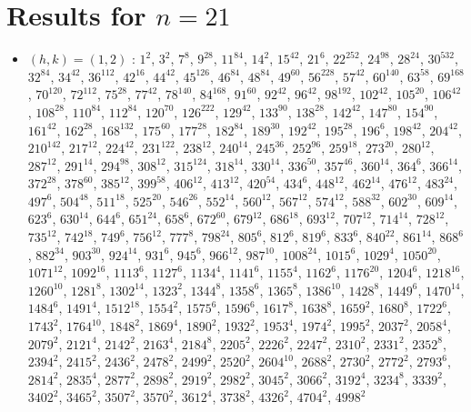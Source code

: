 \section{Results for $n=21$}
\begin{itemize}
\item $(h,k)=(1,2)$ : $1^{2}$, $3^{2}$, $7^{8}$, $9^{28}$, $11^{84}$, $14^{2}$, $15^{42}$, $21^{6}$, $22^{252}$, $24^{98}$, $28^{24}$, $30^{532}$, $32^{84}$, $34^{42}$, $36^{112}$, $42^{16}$, $44^{42}$, $45^{126}$, $46^{84}$, $48^{84}$, $49^{60}$, $56^{228}$, $57^{42}$, $60^{140}$, $63^{58}$, $69^{168}$, $70^{120}$, $72^{112}$, $75^{28}$, $77^{42}$, $78^{140}$, $84^{168}$, $91^{60}$, $92^{42}$, $96^{42}$, $98^{192}$, $102^{42}$, $105^{20}$, $106^{42}$, $108^{28}$, $110^{84}$, $112^{84}$, $120^{70}$, $126^{222}$, $129^{42}$, $133^{90}$, $138^{28}$, $142^{42}$, $147^{80}$, $154^{90}$, $161^{42}$, $162^{28}$, $168^{132}$, $175^{60}$, $177^{28}$, $182^{84}$, $189^{30}$, $192^{42}$, $195^{28}$, $196^{6}$, $198^{42}$, $204^{42}$, $210^{142}$, $217^{12}$, $224^{42}$, $231^{122}$, $238^{12}$, $240^{14}$, $245^{36}$, $252^{96}$, $259^{18}$, $273^{20}$, $280^{12}$, $287^{12}$, $291^{14}$, $294^{98}$, $308^{12}$, $315^{124}$, $318^{14}$, $330^{14}$, $336^{50}$, $357^{46}$, $360^{14}$, $364^{6}$, $366^{14}$, $372^{28}$, $378^{60}$, $385^{12}$, $399^{58}$, $406^{12}$, $413^{12}$, $420^{54}$, $434^{6}$, $448^{12}$, $462^{14}$, $476^{12}$, $483^{24}$, $497^{6}$, $504^{48}$, $511^{18}$, $525^{20}$, $546^{26}$, $552^{14}$, $560^{12}$, $567^{12}$, $574^{12}$, $588^{32}$, $602^{30}$, $609^{14}$, $623^{6}$, $630^{14}$, $644^{6}$, $651^{24}$, $658^{6}$, $672^{60}$, $679^{12}$, $686^{18}$, $693^{12}$, $707^{12}$, $714^{14}$, $728^{12}$, $735^{12}$, $742^{18}$, $749^{6}$, $756^{12}$, $777^{8}$, $798^{24}$, $805^{6}$, $812^{6}$, $819^{6}$, $833^{6}$, $840^{22}$, $861^{14}$, $868^{6}$, $882^{34}$, $903^{30}$, $924^{14}$, $931^{6}$, $945^{6}$, $966^{12}$, $987^{10}$, $1008^{24}$, $1015^{6}$, $1029^{4}$, $1050^{20}$, $1071^{12}$, $1092^{16}$, $1113^{6}$, $1127^{6}$, $1134^{4}$, $1141^{6}$, $1155^{4}$, $1162^{6}$, $1176^{20}$, $1204^{6}$, $1218^{16}$, $1260^{10}$, $1281^{8}$, $1302^{14}$, $1323^{2}$, $1344^{8}$, $1358^{6}$, $1365^{8}$, $1386^{10}$, $1428^{8}$, $1449^{6}$, $1470^{14}$, $1484^{6}$, $1491^{4}$, $1512^{18}$, $1554^{2}$, $1575^{6}$, $1596^{6}$, $1617^{8}$, $1638^{8}$, $1659^{2}$, $1680^{8}$, $1722^{6}$, $1743^{2}$, $1764^{10}$, $1848^{2}$, $1869^{4}$, $1890^{2}$, $1932^{2}$, $1953^{4}$, $1974^{2}$, $1995^{2}$, $2037^{2}$, $2058^{4}$, $2079^{2}$, $2121^{4}$, $2142^{2}$, $2163^{4}$, $2184^{8}$, $2205^{2}$, $2226^{2}$, $2247^{2}$, $2310^{2}$, $2331^{2}$, $2352^{8}$, $2394^{2}$, $2415^{2}$, $2436^{2}$, $2478^{2}$, $2499^{2}$, $2520^{2}$, $2604^{10}$, $2688^{2}$, $2730^{2}$, $2772^{2}$, $2793^{6}$, $2814^{2}$, $2835^{4}$, $2877^{2}$, $2898^{2}$, $2919^{2}$, $2982^{2}$, $3045^{2}$, $3066^{2}$, $3192^{4}$, $3234^{8}$, $3339^{2}$, $3402^{2}$, $3465^{2}$, $3507^{2}$, $3570^{2}$, $3612^{4}$, $3738^{2}$, $4326^{2}$, $4704^{2}$, $4998^{2}$

\end{itemize}
